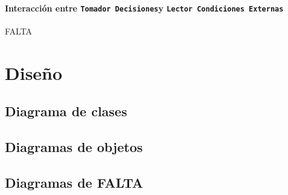 \documentclass{article}
\newcommand{\condiciones}{\texttt{Lector Condiciones Externas}}
\newcommand{\decisiones}{\texttt{Tomador Decisiones}}
\begin{document}
    \paragraph{Interacci\'on entre \decisiones y \condiciones}
    FALTA


  \section{Dise\~no}

    \subsection{Diagrama de clases}

    \subsection{Diagramas de objetos}

    \subsection{Diagramas de FALTA}

%
% 
% 
%
\end{document}
